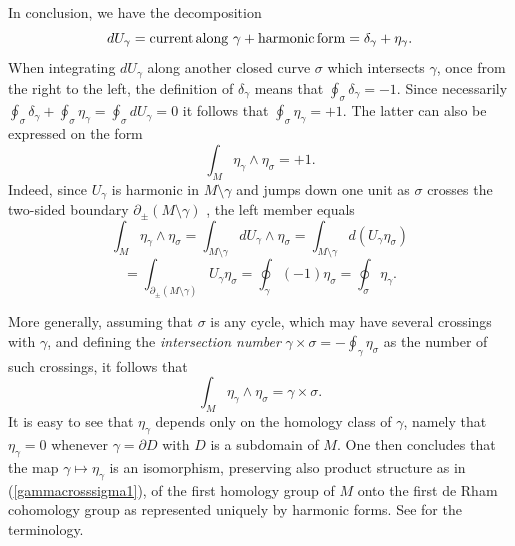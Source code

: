 \documentclass[reqno,12pt]{article}
\theoremstyle{plain}
\theoremstyle{definition}
\numberwithin{equation}{section}
\numberwithin{figure}{section}
\begin{document}
In conclusion, we have the decomposition
\begin{equation}\label{deltaeta}
dU_\gamma= {\rm current \, along\,\,}\gamma +{\rm harmonic \,form}
=\delta_\gamma+\eta_\gamma.
\end{equation}
When integrating $dU_\gamma$ along another closed curve $\sigma$ which intersects $\gamma$, once
from the right to the left, the definition of $\delta_\gamma$ means that $\oint_\sigma \delta_\gamma=-1$.
Since necessarily $\oint_\sigma \delta_\gamma+\oint_\sigma \eta_\gamma=\oint_\sigma dU_\gamma=0$
it follows that $\oint_\sigma \eta_\gamma=+1$. The latter can also be expressed on the form
$$
\int_M \eta_\gamma \wedge \eta_\sigma=+1.
$$
Indeed, since $U_\gamma$ is harmonic in $M\setminus\gamma$ and jumps down one unit as $\sigma$ 
crosses the two-sided boundary $\partial_\pm (M\setminus\gamma)$ , the left member equals
$$
\int_M \eta_\gamma\wedge \eta_\sigma
=\int_{M\setminus \gamma} dU_\gamma\wedge \eta_\sigma
=\int_{M\setminus \gamma} d(U_\gamma \eta_\sigma)
$$
$$
=\int_{\partial_\pm (M\setminus \gamma)}U_\gamma\eta_\sigma
=\oint_\gamma(-1)\eta_\sigma=\oint_\sigma\eta_\gamma.
$$ 

More generally, assuming that  $\sigma$ is any cycle, which may have several 
crossings with $\gamma$, and defining the {\it intersection number} 
$\gamma\times\sigma=-\oint_\gamma \eta_\sigma$ 
as the number of such crossings, it follows that
\begin{equation}\label{gammacrosssigma1}
\int_M \eta_\gamma\wedge \eta_\sigma=\gamma\times\sigma.
\end{equation}
It is easy to see that $\eta_\gamma$ depends only on the homology class of $\gamma$, namely that
$\eta_\gamma=0$ whenever $\gamma =\partial D$ with $D$ is a subdomain of $M$.
One then concludes that the map $\gamma\mapsto \eta_\gamma$ is an isomorphism,
preserving also product structure as in (\ref{gammacrosssigma1}), 
of the first homology group of $M$  onto the first
de Rham cohomology group as represented uniquely by harmonic forms. See \cite{deRham-1984, Warner-1983}
for the terminology. 
\end{document}

